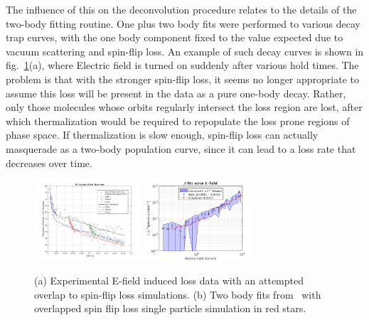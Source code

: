 \documentclass[%
 reprint,
 amsmath,amssymb,
 aps,
prl,
]{revtex4-1}
\begin{document}
The influence of this on the deconvolution procedure relates to the details of the two-body fitting routine.
One plus two body fits were performed to various decay trap curves, with the one body component fixed to the value expected due to vacuum scattering and spin-flip loss.
An example of  such decay curves is shown in fig.~\ref{fig:eil}(a), where Electric field is turned on suddenly after various hold times.
The problem is that with the stronger spin-flip loss, it seems no longer appropriate to assume this loss will be present in the data as a pure one-body decay.
Rather, only those molecules whose orbits regularly intersect the loss region are lost, after which thermalization would be required to repopulate the loss prone regions of phase space. 
If thermalization is slow enough, spin-flip loss can actually masquerade as a two-body population curve, since it can lead to a loss rate that decreases over time.

\begin{figure}[tb]
\includegraphics[width=4cm]{SuppFigs/EIL.png}%
\includegraphics[width=4cm]{SuppFigs/Beta.png}%
\caption{
(a) Experimental E-field induced loss data with an attempted overlap to spin-flip loss simulations. (b) Two body fits from~\cite{Stuhl2013} with overlapped spin flip loss single particle simulation in red stars.
}
\label{fig:eil}
\end{figure}
\end{document}
